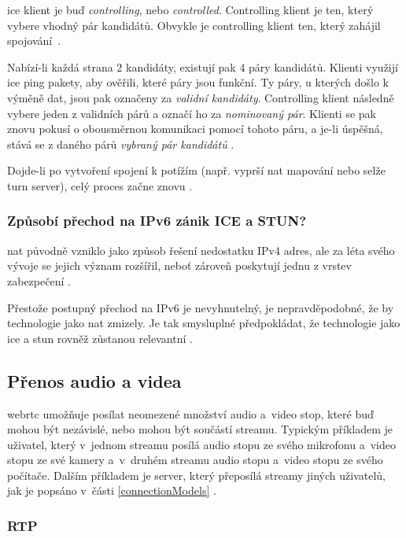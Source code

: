 \gls{ice} klient je buď \textit{controlling}, nebo \textit{controlled}.
Controlling klient je ten, který vybere vhodný pár kandidátů. Obvykle je
controlling klient ten, který zahájil spojování~\parencite{WebRTCForTheCurious}.

Nabízí-li každá strana 2 kandidáty, existují pak 4 páry kandidátů. Klienti
využijí \gls{ice} ping pakety, aby ověřili, které páry jsou funkční. Ty páry, u
kterých došlo k výměně dat, jsou pak označeny za \textit{validní kandidáty}.
Controlling klient následně vybere jeden z validních párů a označí ho za
\textit{nominovaný pár}. Klienti se pak znovu pokusí o obousměrnou komunikaci
pomocí tohoto páru, a je-li úspěšná, stává se z daného párů \textit{vybraný pár
    kandidátů} \parencite{WebRTCForTheCurious}.

Dojde-li po vytvoření spojení k potížím (např. vyprší \gls{nat} mapování nebo
selže \gls{turn} server), celý proces začne znovu
\parencite{WebRTCForTheCurious}.

\subsubsection{Způsobí přechod na IPv6 zánik ICE a STUN?}

\gls{nat} původně vzniklo jako způsob řešení nedostatku IPv4 adres, ale za léta
svého vývoje se jejich význam rozšířil, neboť zároveň poskytují jednu z vrstev
zabezpečení \parencite{Quora-WillIPv6KillSTUNAndICE}.

Přestože postupný přechod na IPv6 je nevyhnutelný, je nepravděpodobné, že by
technologie jako \gls{nat} zmizely. Je tak smysluplné předpokládat, že
technologie jako \gls{ice} a \gls{stun} rovněž zůstanou relevantní
\parencite{Quora-WillIPv6KillSTUNAndICE}.

\subsection{Přenos audio a videa}

\gls{webrtc} umožňuje posílat neomezené množství audio a~video stop, které buď
mohou být nezávislé, nebo mohou být součástí streamu. Typickým příkladem je
uživatel, který v~jednom streamu posílá audio stopu ze svého mikrofonu a~video
stopu ze své kamery a~v~druhém streamu audio stopu a~video stopu ze svého
počítače. Dalším příkladem je server, který přeposílá streamy jiných uživatelů,
jak je popsáno v~části \ref{connectionModels} \parencite{WebRTCForTheCurious}.

\subsubsection{RTP}\label{rtp}

